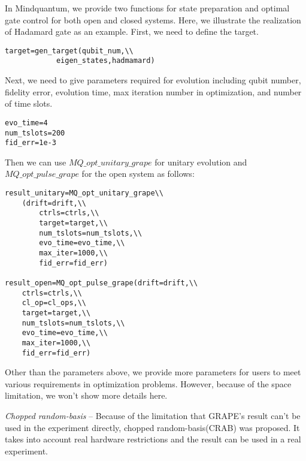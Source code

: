 In Mindquantum, we provide two functions for state preparation and optimal gate control for both open and closed systems. Here, we illustrate the realization of Hadamard gate as an example. First, we need to define the target.
\begin{lstlisting}
target=gen_target(qubit_num,\\
            eigen_states,hadmamard)
\end{lstlisting}
Next, we need to give parameters required for evolution including qubit number, fidelity error, evolution time, max iteration number in optimization, and number of time slots.
\begin{lstlisting}
evo_time=4
num_tslots=200
fid_err=1e-3
\end{lstlisting}
Then we can use $MQ\_opt\_unitary\_grape$ for unitary evolution and $MQ\_opt\_pulse\_grape$ for the open system as follows:
\begin{lstlisting}
result_unitary=MQ_opt_unitary_grape\\
    (drift=drift,\\
        ctrls=ctrls,\\
        target=target,\\
        num_tslots=num_tslots,\\
        evo_time=evo_time,\\
        max_iter=1000,\\
        fid_err=fid_err)

result_open=MQ_opt_pulse_grape(drift=drift,\\
    ctrls=ctrls,\\
    cl_op=cl_ops,\\
    target=target,\\
    num_tslots=num_tslots,\\
    evo_time=evo_time,\\
    max_iter=1000,\\
    fid_err=fid_err)
\end{lstlisting}
Other than the parameters above, we provide more parameters for users to meet various requirements in optimization problems. However, because of the space limitation, we won't show more details here.

\textit{Chopped random-basis} -- Because of the limitation that GRAPE's result can't be used in the experiment directly, chopped random-basis(CRAB) was proposed. It takes into account real hardware restrictions and the result can be used in a real experiment.

